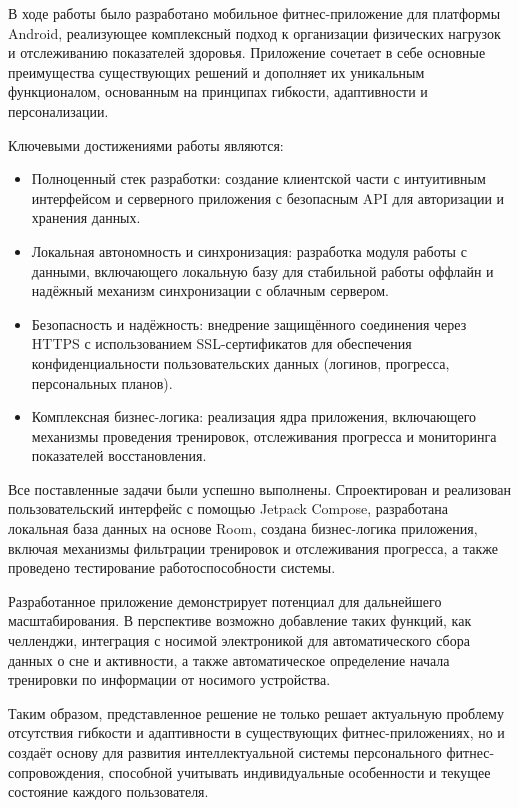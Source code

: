 
В ходе работы было разработано мобильное фитнес-приложение для платформы Android, реализующее комплексный подход к организации физических нагрузок и отслеживанию показателей здоровья. Приложение сочетает в себе основные преимущества существующих решений и дополняет их уникальным функционалом, основанным на принципах гибкости, адаптивности и персонализации.

Ключевыми достижениями работы являются:

\begin{itemize}
    \item Полноценный стек разработки: создание клиентской части с интуитивным интерфейсом и серверного приложения с безопасным API для авторизации и хранения данных.

    \item Локальная автономность и синхронизация: разработка модуля работы с данными, включающего локальную базу для стабильной работы оффлайн и надёжный механизм синхронизации с облачным сервером.

    \item Безопасность и надёжность: внедрение защищённого соединения через HTTPS с использованием SSL-сертификатов для обеспечения конфиденциальности пользовательских данных (логинов, прогресса, персональных планов).

    \item Комплексная бизнес-логика: реализация ядра приложения, включающего механизмы проведения тренировок, отслеживания прогресса и мониторинга показателей восстановления.

\end{itemize}

Все поставленные задачи были успешно выполнены. Спроектирован и реализован пользовательский интерфейс с помощью Jetpack Compose, разработана локальная база данных на основе Room, создана бизнес-логика приложения, включая механизмы фильтрации тренировок и отслеживания прогресса, а также проведено тестирование работоспособности системы.

Разработанное приложение демонстрирует потенциал для дальнейшего масштабирования. В перспективе возможно добавление таких функций, как челленджи, интеграция с носимой электроникой для автоматического сбора данных о сне и активности, а также автоматическое определение начала тренировки по информации от носимого устройства. 

Таким образом, представленное решение не только решает актуальную проблему отсутствия гибкости и адаптивности в существующих фитнес-приложениях, но и создаёт основу для развития интеллектуальной системы персонального фитнес-сопровождения, способной учитывать индивидуальные особенности и текущее состояние каждого пользователя.
